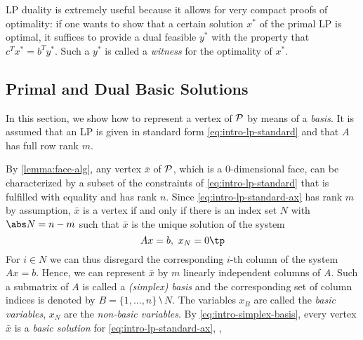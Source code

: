 LP duality is extremely useful because it allows for very compact proofs of optimality: if one wants to show that a certain solution $x^*$ of the primal LP is optimal, it suffices to provide a dual feasible $y^*$ with the property that $c^Tx^* = b^Ty^*$. Such a $y^*$ is called a \emph{witness} for the optimality of $x^*$.

\subsection{Primal and Dual Basic Solutions}
In this section, we show how to represent a vertex of $\P$ by means of a \emph{basis}. It is assumed that an LP is given in standard form \cref{eq:intro-lp-standard} and that $A$ has full row rank $m$.

By \cref{lemma:face-alg}, any vertex $\bar x$ of $\P$, which is a $0$-dimensional face, can be characterized by a subset of the constraints of \cref{eq:intro-lp-standard} that is fulfilled with equality and has rank $n$. Since \cref{eq:intro-lp-standard-ax} has rank $m$ by assumption, $\bar x$ is a vertex if and only if there is an index set $N$ with $\abs N = n-m$ such that $\bar x$ is the unique solution of the system
\begin{equation}\label{eq:intro-simplex-basis}
    Ax = b,\ x_N = 0\tp
\end{equation}
For $i ∈ N$ we can thus disregard the corresponding $i$-th column of the system $Ax=b$. Hence, we can represent $\bar x$ by $m$ linearly independent columns of $A$. Such a submatrix of $A$ is called a \emph{(simplex) basis} and the corresponding set of column indices is denoted by $B = \{1,\dotsc,n\} ⧵ N$. The variables $x_B$ are called the \emph{basic variables}, $x_N$ are the \emph{non-basic variables}. By \cref{eq:intro-simplex-basis}, every vertex $\bar x$ is a \emph{basic solution} for \cref{eq:intro-lp-standard-ax}, \ie,
%
